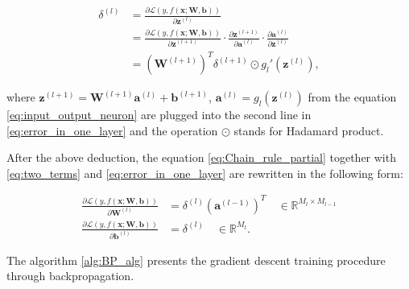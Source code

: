 \documentclass[
	parskip, 			   %
	twoside, 			   %
	DIV=14, 			   %
	BCOR=15.0mm, 		   %
	headsepline, 		   %
	open=right, 		   %
	captions=tableheading, %
	bibliography=totoc,    %
	numbers=noenddot       %
]{scrreprt}
\begin{document}
\begin{equation}
    \label{eq:error_in_one_layer}
    \begin{aligned}
        \delta^{(l)} &= \frac{\partial \mathcal{L}\left( y,f(\mathbf{x};\mathbf{\mathbf{W},\mathbf{b}}) \right)}{\partial \mathbf{z}^{(l)}}
        \\
        &= \frac{\partial \mathcal{L}\left( y,f(\mathbf{x};\mathbf{\mathbf{W},\mathbf{b}}) \right)}{\partial \mathbf{z}^{(l+1)}} \cdot \frac{\partial \mathbf{z}^{(l+1)}}{\partial \mathbf{a}^{(l)}} \cdot \frac{\partial \mathbf{a}^{(l)}}{\partial \mathbf{z}^{(l)}}
        \\
        &= (\mathbf{W}^{(l+1)})^T \delta^{(l+1)} \odot g_{l}'(\mathbf{z}^{(l)}),
    \end{aligned}
\end{equation}

where $\mathbf{z}^{(l+1)} = \mathbf{W}^{(l+1)} \mathbf{a}^{(l)} + \mathbf{b}^{(l+1)}$, $\mathbf{a}^{(l)} = g_{l}(\mathbf{z}^{(l)})$ from the equation \ref{eq:input_output_neuron} are plugged into the second line in \ref{eq:error_in_one_layer} and the operation $\odot$ stands for Hadamard product.

After the above deduction, the equation \ref{eq:Chain_rule_partial} together with \ref{eq:two_terms} and \ref{eq:error_in_one_layer} are rewritten in the following form:

\begin{equation}
    \label{eq:Chain_rule_partial_deducted}
    \begin{aligned}
        \frac{\partial \mathcal{L}\left( y,f(\mathbf{x};\mathbf{\mathbf{W},\mathbf{b}}) \right)}{\partial \mathbf{W}^{(l)}} &= \delta^{(l)} (\mathbf{a}^{(l-1)})^T \quad \in \mathbb{R}^{M_{l} \times M_{l-1}}
        \\
        \frac{\partial \mathcal{L}\left( y,f(\mathbf{x};\mathbf{\mathbf{W},\mathbf{b}}) \right)}{\partial \mathbf{b}^{(l)}} &= \delta^{(l)} \quad \in \mathbb{R}^{M_{l}}.
    \end{aligned}
\end{equation}

The algorithm \ref{alg:BP_alg} presents the gradient descent training procedure through backpropagation.
\end{document}
